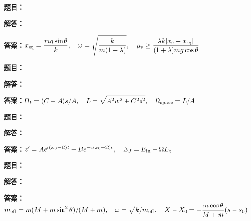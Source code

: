 \documentclass[lang=cn,color=blue,11pt]{elegantbook}
\begin{document}
\noindent\textbf{题目：}
\par\noindent\textbf{解答：}
\par\noindent\textbf{答案：}\(\displaystyle x_{\rm eq}=\frac{mg\sin\theta}{k},\quad\omega=\sqrt{\frac{k}{m(1+\lambda)}},\quad\mu_s\ge\frac{\lambda k|x_0-x_{\rm eq}|}{(1+\lambda)mg\cos\theta}\)\par
\par\smallskip\noindent\hrulefill\par\medskip
{}\par
\noindent\textbf{题目：}
\par\noindent\textbf{解答：}
\par\noindent\textbf{答案：}\(\displaystyle \Omega_b=(C-A)s/A,\quad L=\sqrt{A^2w^2+C^2s^2},\quad\Omega_{\rm space}=L/A\)\par
\par\smallskip\noindent\hrulefill\par\medskip
{}\par
\noindent\textbf{题目：}
\par\noindent\textbf{解答：}
\par\noindent\textbf{答案：}\(\displaystyle z'=Ae^{i(\omega_0-\Omega)t}+Be^{-i(\omega_0+\Omega)t},\quad E_J=E_{\rm in}-\Omega L_z\)\par
\par\smallskip\noindent\hrulefill\par\medskip
{}\par
\noindent\textbf{题目：}
\par\noindent\textbf{解答：}
\par\noindent\textbf{答案：}\(\displaystyle m_{\rm eff}=m(M+m\sin^2\theta)/(M+m),\quad\omega=\sqrt{k/m_{\rm eff}},\quad X-X_0=-\frac{m\cos\theta}{M+m}(s-s_0)\)\par
\par\smallskip\noindent\hrulefill\par\medskip
{}\par
\end{document}
